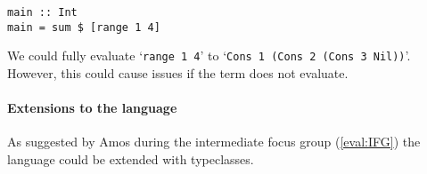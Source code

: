 \begin{lstlisting}[language=SFL]
main :: Int 
main = sum $ [range 1 4]
\end{lstlisting}

\noindent We could fully evaluate `\lstinline[language=SFL]|range 1 4|' to `\lstinline[language=SFL]|Cons 1 (Cons 2 (Cons 3 Nil))|'. However, this could cause issues if the term does not evaluate. 







\paragraph{Extensions to the language}
As suggested by Amos during the intermediate focus group (\ref{eval:IFG}) the language could be extended with typeclasses. 
